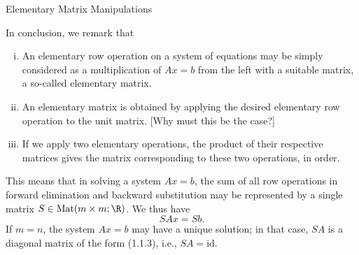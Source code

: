 \documentclass[smaller,hyperref={CJKbookmarks=true}]{beamer}
\begin{document}
\begin{frame}{Elementary Matrix Manipulations}
\begin{spacing}{1}
\newpage
In conclusion, we remark that
\begin{enumerate}[(i)]
  \item An elementary row operation on a system of equations may be simply
considered as a multiplication of $Ax = b$ from the left with a suitable
matrix, a so-called elementary matrix.
  \item An elementary matrix is obtained by applying the desired elementary
row operation to the unit matrix. [Why must this be the case?]
  \item If we apply two elementary operations, the product of their respective matrices gives the matrix corresponding to these two operations, in order.
\end{enumerate}
This means that in solving a system $Ax = b$, the sum of all row operations
in forward elimination and backward substitution may be represented by a
single matrix $S\in\text{Mat}(m\times m;\R)$. We thus have
\[SAx=Sb.\]
If $m=n$, the system $Ax=b$ may have a unique solution; in that case, $SA$ is a diagonal matrix of the form (1.1.3), i.e., $SA=\text{id}$.
\end{spacing}
\end{frame}
\end{document}

